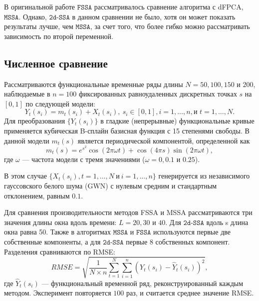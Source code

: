 \documentclass[12pt, specialist, subf
]{disser}
\theoremstyle{definition}
\newcommand{\MSSA}{\texttt{MSSA}}
\newcommand{\FSSA}{\texttt{FSSA}}
\newcommand{\DSSA}{\texttt{2d-SSA}}
\begin{document}
\label{sec:compare_fssa_ssa}

В оригинальной работе $\FSSA$ \cite{haghbin2019functionalsingularspectrumanalysis} рассматривалось сравнение алгоритма с dFPCA, $\MSSA$. Однако, $\DSSA$ в данном сравнении не было, хотя он может показать результаты лучше, чем $\MSSA$, за счет того, что более гибко можно рассматривать зависимость по второй переменной.


\subsection{Численное сравнение}

Рассматриваются функциональные временные ряды длины $N=50, 100, 150$ и $200$, наблюдаемые в $n=100$ фиксированных равноудаленных дискретных точках $s$ на $[0,1]$ по следующей модели:
\begin{equation}\label{eq:mainmodel}
	Y_t\left(s_i\right)=m_t(s_i)+X_t\left(s_i\right),\ s_i \in [0,1], i=1,\ldots,n, \text{и } t=1, \dots, N.
\end{equation}
Для преобразования $\{Y_t(s_i)\}$ в гладкие (непрерывные) функциональные кривые применяется кубическая B-сплайн базисная функция с 15 степенями свободы. В данной модели $m_t(s)$ является периодической компонентой, определенной как
\begin{equation}\label{eq:Trend}
	m_t(s)=e^{s^2} \cos\left(2\pi \omega t\right)+\cos(4\pi s) \sin\left(2\pi \omega t\right),
\end{equation}
где $\omega$ — частота модели с тремя значениями ($\omega=0, 0.1$ и $0.25$).

В этом случае $\{X_t(s_i), t=1,\ldots, N\ \text{и}\ i=1,\ldots,n \}$ генерируется из независимого гауссовского белого шума (GWN) с нулевым средним и стандартным отклонением, равным $0.1$.

Для сравнения производительности методов FSSA и MSSA рассматриваются три значения длины окна вдоль времени: $L=20, 30$ и $40$. Для $\DSSA$ вдоль s длина окна равна 50. Также в алгоритмах $\MSSA$ и $\FSSA$ используются первые две собственные компоненты, а для $\DSSA$ первые 8 собственных компонент. Разделения сравниваются по RMSE:
\[RMSE= \sqrt {\frac{1}{N\times n}\sum\limits_{t=1}^N \sum_{i=1}^n \left(Y_t(s_i)-\hat{Y}_t(s_i)\right)^2},\]
где $\hat{Y}_t(s_i)$ — функциональный временной ряд, реконструированный каждым методом. Эксперимент повторяется $100$ раз, и считается среднее значение RMSE.
\end{document}
